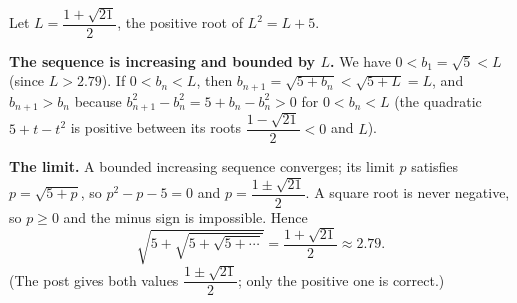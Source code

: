 Let $L=\dfrac{1+\sqrt{21}}{2}$, the positive root of $L^2=L+5$.

\textbf{The sequence is increasing and bounded by $L$.} We have $0<b_1=\sqrt5<L$ (since $L>2.79$). If $0<b_n<L$, then $b_{n+1}=\sqrt{5+b_n}<\sqrt{5+L}=L$, and $b_{n+1}>b_n$ because $b_{n+1}^2-b_n^2=5+b_n-b_n^2>0$ for $0<b_n<L$ (the quadratic $5+t-t^2$ is positive between its roots $\dfrac{1-\sqrt{21}}{2}<0$ and $L$).

\textbf{The limit.} A bounded increasing sequence converges; its limit $p$ satisfies $p=\sqrt{5+p}$, so $p^2-p-5=0$ and $p=\dfrac{1\pm\sqrt{21}}{2}$. A square root is never negative, so $p\ge0$ and the minus sign is impossible. Hence
\[
\sqrt{5+\sqrt{5+\sqrt{5+\cdots}}}=\boxed{\dfrac{1+\sqrt{21}}{2}}\approx2.79 .
\]
(The post gives both values $\dfrac{1\pm\sqrt{21}}{2}$; only the positive one is correct.)
